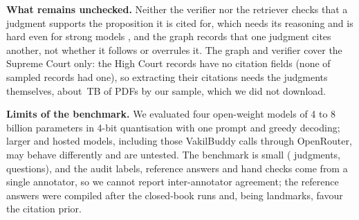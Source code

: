 \textbf{What remains unchecked.} Neither the verifier nor the retriever checks that a judgment supports the proposition it is cited for, which needs its reasoning and is hard even for strong models \cite{verma2026}, and the graph records that one judgment cites another, not whether it follows or overrules it. The graph and verifier cover the Supreme Court only: the High Court records have no citation fields (none of \HCMetaN{} sampled records had one), so extracting their citations needs the judgments themselves, about \HCTotalTB\,TB of PDFs by our sample, which we did not download.

\textbf{Limits of the benchmark.} We evaluated four open-weight models of 4 to 8 billion parameters in 4-bit quantisation with one prompt and greedy decoding; larger and hosted models, including those VakilBuddy calls through OpenRouter, may behave differently and are untested. The benchmark is small (\NumJudgments{} judgments, \NumTopics{} questions), and the audit labels, reference answers and hand checks come from a single annotator, so we cannot report inter-annotator agreement; the reference answers were compiled after the closed-book runs and, being landmarks, favour the citation prior.



\begin{table}[t]
\caption{Identifying a judgment from its citation. T1: \NumTOne{} real citations. T2: \NumTTwo{} citations that cannot exist. Corr.\ = named the right judgment; Named = named any judgment for a fabricated citation; Decl.\ = declined; Inv.\ = invalid output. ``Qwen3 8B think'' is the same model with reasoning enabled.}
\label{tab:t1t2}
\centering
\scriptsize
\setlength{\tabcolsep}{2.5pt}

\end{table}

\begin{table}[t]
\caption{T5: the T4 answers that contained an unverified case (Q), before and after the model revised them with the verifier's feedback.}
\label{tab:t5}
\centering
\scriptsize
\setlength{\tabcolsep}{2.5pt}

\end{table}

\begin{table}[t]
\caption{T4: every case cited for \NumTopics{} legal questions, by verifier label. Ver.\ = VERIFIED (with Wilson 95\% interval), W.Yr.\ = WRONG\_YEAR, W.Cit.\ = WRONG\_CITATION, Misatt.\ = MISATTRIBUTED, N.F.\ = NOT\_FOUND.}
\label{tab:t4}
\centering
\scriptsize
\setlength{\tabcolsep}{2.5pt}

\end{table}

